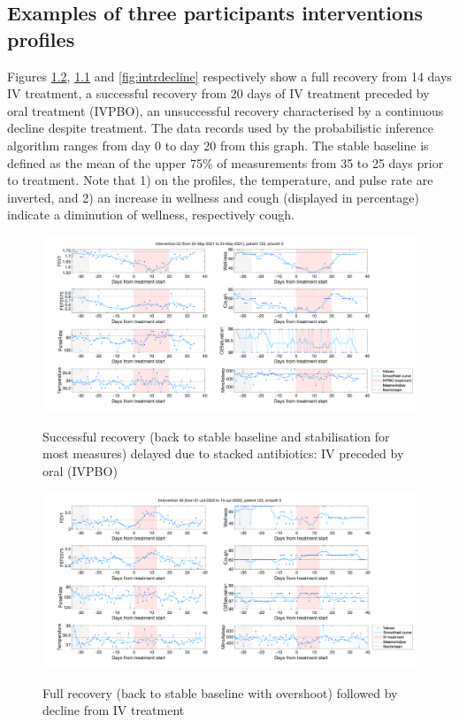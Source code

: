 \begin{appendices}
\chapter{Examples of three participants interventions profiles} \label{sec:appendixint}
Figures \ref{fig:intrfull}, \ref{fig:intrivpbo} and \ref{fig:intrdecline} respectively show a full recovery from 14 days IV treatment, a successful recovery from 20 days of IV treatment preceded by oral treatment (IVPBO), an unsuccessful recovery characterised by a continuous decline despite treatment. The data records used by the probabilistic inference algorithm ranges from day 0 to day 20 from this graph. The stable baseline is defined as the mean of the upper 75\% of measurements from 35 to 25 days prior to treatment. Note that 1) on the profiles, the temperature, and pulse rate are inverted, and 2) an increase in wellness and cough (displayed in percentage) indicate a diminution of wellness, respectively cough.
    
    \begin{figure}[!h]
    \caption{Successful recovery (back to stable baseline and stabilisation for most measures) delayed due to stacked antibiotics: IV preceded by oral (IVPBO)}
    \centering
    \includegraphics[width=150mm]{images/Intervention52_ID133.png}
    \label{fig:intrivpbo}
    \end{figure}
    
    \begin{figure}[!h]
    \caption{Full recovery (back to stable baseline with overshoot) followed by decline from IV treatment}
    \centering
    \includegraphics[width=150mm]{images/Intervention40_ID123.png}
    \label{fig:intrfull}
    \end{figure}
    

\end{appendices}
